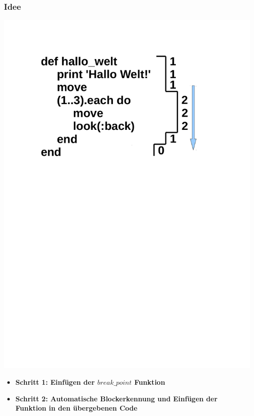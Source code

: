 \begin{frame}
	\frametitle{Idee}
	\begin{center}
		\includegraphics[scale=0.4]{scopes/beispiel3.pdf}
	\end{center}
\end{frame}

\begin{frame}

	\begin{itemize}
		\item[]\textbf{Schritt 1: Einfügen der $ break\_point $ Funktion} \\
		\item[]\textbf{Schritt 2: Automatische Blockerkennung und Einfügen der Funktion in den übergebenen Code} \\
	\end{itemize}
\end{frame}


